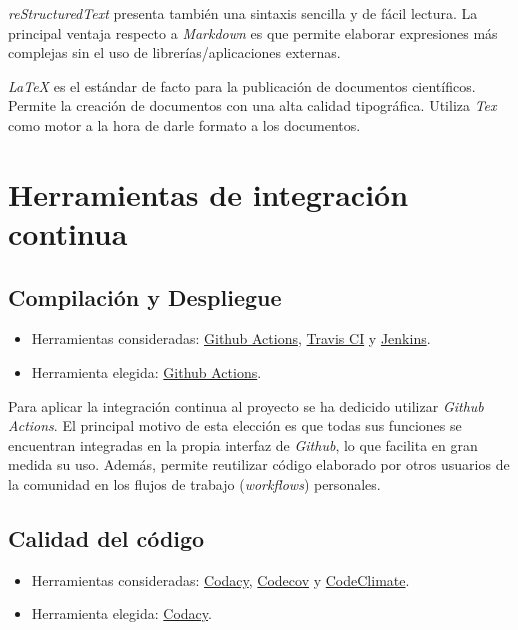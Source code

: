 \documentclass[
]{article}
\providecommand{\tightlist}{%
  \setlength{\itemsep}{0pt}\setlength{\parskip}{0pt}}
\begin{document}
\emph{reStructuredText} presenta también una sintaxis sencilla y de
fácil lectura. La principal ventaja respecto a \emph{Markdown} es que
permite elaborar expresiones más complejas sin el uso de
librerías/aplicaciones externas.

\emph{LaTeX} es el estándar de facto para la publicación de documentos
científicos. Permite la creación de documentos con una alta calidad
tipográfica. Utiliza \emph{Tex} como motor a la hora de darle formato a
los documentos.

\hypertarget{herramientas-de-integraciuxf3n-continua}{%
\section{Herramientas de integración
continua}\label{herramientas-de-integraciuxf3n-continua}}

\hypertarget{compilaciuxf3n-y-despliegue}{%
\subsection{Compilación y
Despliegue}\label{compilaciuxf3n-y-despliegue}}

\begin{itemize}
\tightlist
\item
  Herramientas consideradas:
  \href{https://github.com/features/actions}{Github Actions},
  \href{https://travis-ci.org/}{Travis CI} y
  \href{https://jenkins.io/}{Jenkins}.
\item
  Herramienta elegida: \href{https://github.com/features/actions}{Github
  Actions}.
\end{itemize}

Para aplicar la integración continua al proyecto se ha dedicido utilizar
\emph{Github Actions}. El principal motivo de esta elección es que todas
sus funciones se encuentran integradas en la propia interfaz de
\emph{Github}, lo que facilita en gran medida su uso. Además, permite
reutilizar código elaborado por otros usuarios de la comunidad en los
flujos de trabajo (\emph{workflows}) personales.

\hypertarget{calidad-del-cuxf3digo}{%
\subsection{Calidad del código}\label{calidad-del-cuxf3digo}}

\begin{itemize}
\tightlist
\item
  Herramientas consideradas: \href{https://codacy.com}{Codacy},
  \href{https://codecov.io/}{Codecov} y
  \href{https://codeclimate.com/}{CodeClimate}.
\item
  Herramienta elegida: \href{https://codacy.com}{Codacy}.
\end{itemize}
\end{document}
